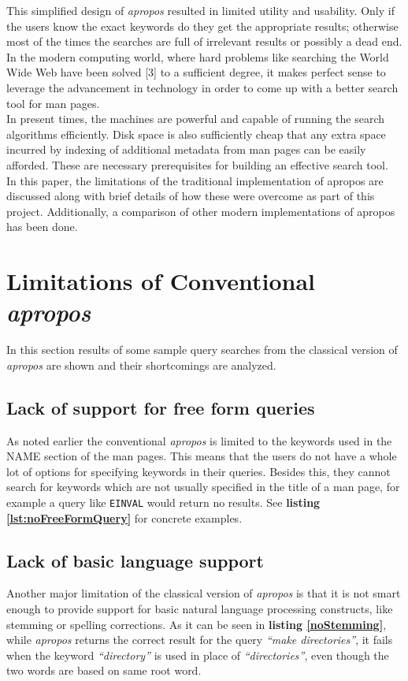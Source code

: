 \documentclass[letterpaper,twocolumn,10pt]{article}
\begin{document}
This simplified design of \textit{apropos} resulted in limited utility and
usability. Only if the users know the exact keywords do they get
the appropriate results; otherwise most of
the times the searches are full of irrelevant results or possibly a dead end. 
In the modern
computing world, where hard problems like searching the World Wide Web have been
solved [3] to a sufficient degree, it makes perfect sense to leverage the
advancement in technology in order to come up with a better search tool for
man pages. \\

In present times, the machines are powerful and  capable of running the search
algorithms efficiently. Disk
space is also sufficiently cheap that any extra space incurred by indexing of
additional metadata from man pages
can be easily afforded. These are necessary prerequisites for building an
effective search tool. \\

In this paper, the limitations of the traditional implementation of apropos
are discussed along with brief details of how these were overcome as part of
this project. Additionally, a comparison of other modern implementations of apropos has been done. \\

\section{Limitations of Conventional \textit{apropos}}
In this section results of some sample query searches from
the classical version of \textit{apropos} are shown and their shortcomings are
analyzed. \\

\subsection{Lack of support for free form queries}
As noted earlier the conventional \textit{apropos} is limited to the keywords
used in the NAME section of the man pages. This means that the users do not have
a whole lot of options for specifying keywords in their queries. Besides this,
they cannot search for keywords which are not usually specified in the title of
a man page, for example a query like {\tt EINVAL} would return no results.
See {\bf listing \ref{lst:noFreeFormQuery}} for concrete examples.  \\

\subsection{Lack of basic language support}
Another major limitation of the classical version of \textit{apropos} is that
it is not smart enough to provide support for basic natural language processing
constructs,
like stemming or spelling corrections.
As it can be seen in {\bf listing \ref{noStemming}},
while \textit{apropos} returns the correct result for the query
\textit{``make directories''}, it fails when the keyword \textit{``directory''}
is used in place of \textit{``directories''}, even though the two words are based
on same root word. \\
\end{document}

